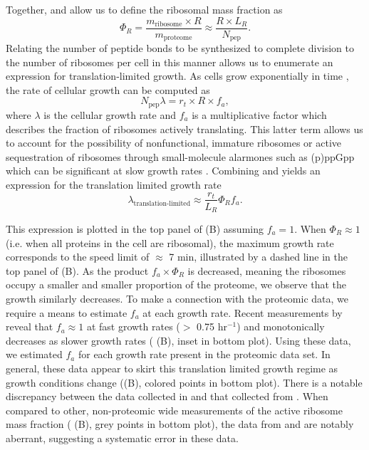 Together,  and  allow us to define the ribosomal mass
fraction as
\begin{equation}
  \Phi_R = \frac{m_\text{ribosome} \times R}{m_\text{proteome}} \approx \frac{R \times L_R}{N_\text{pep}}.
  \label{eq:phir}
\end{equation}
Relating the number of peptide bonds to be synthesized to complete division to
the number of ribosomes per cell in this manner allows us to enumerate an
expression for translation-limited growth. As cells grow exponentially in time
\cite{godin2010}, the rate of cellular growth can be computed as
\begin{equation}
N_\text{pep} \lambda = r_t \times R \times f_a,
\label{eq:exp_cell_growth}
\end{equation}
where $\lambda$ is the cellular growth rate and $f_a$ is a multiplicative factor
which describes the fraction of ribosomes actively translating. This latter term
allows us to account for the possibility of nonfunctional, immature ribosomes or
active sequestration of ribosomes through small-molecule alarmones such as
(p)ppGpp which can be significant at slow growth rates \citep{dennis2004,
dai2016}. Combining  and  yields an expression for
the translation limited growth rate
\begin{equation}
\lambda_\text{translation-limited} \approx \frac{r_t}{L_R}\Phi_Rf_a.
\label{eq:lam_lim}
\end{equation}

This expression is plotted in the top panel of (B) assuming $f_a =
1$. When $\Phi_R \approx 1$ (i.e. when all proteins in the cell are ribosomal),
the maximum growth rate corresponds to the speed limit of $\approx$ 7 min,
illustrated by a dashed line in the top panel of (B). As the product
$f_a \times \Phi_R$ is
decreased, meaning the ribosomes occupy a smaller and smaller proportion of the
proteome, we observe that the growth similarly decreases. To make a connection
with the proteomic data, we require a means to estimate $f_a$ at each growth
rate. Recent measurements by \cite{dai2016} reveal that $f_a \approx 1$ at fast
growth rates ($>$ 0.75 hr$^{-1}$) and monotonically decreases as slower growth
rates ( (B), inset in bottom plot). Using these data, we estimated
$f_a$ for each growth rate present in the proteomic data set. In general, these
data appear to skirt this translation limited growth regime as growth conditions
change ((B), colored points in bottom plot). There is a notable
discrepancy between the data collected in \cite{schmidt2016, li2014} and that
collected from \cite{valgepea2013, peebo2015}. When compared to other,
non-proteomic wide measurements of the active ribosome mass fraction
( (B), grey points in bottom plot), the data from \cite{valgepea2013}
and \cite{peebo2015} are notably aberrant, suggesting a systematic error in
these data.



